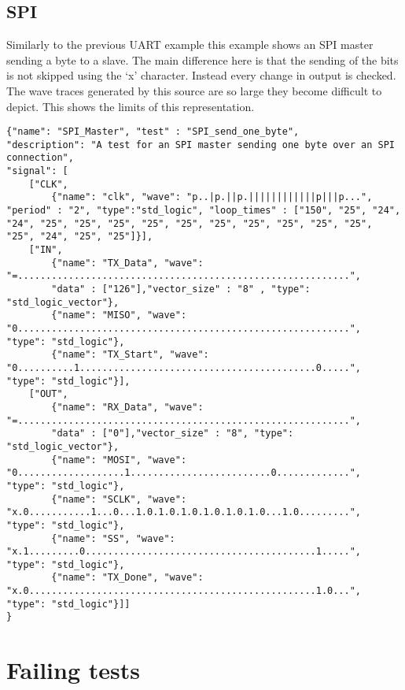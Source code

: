 \subsection{SPI}\label{appendix:more_examples:spi}
Similarly to the previous UART example this example shows an SPI master sending a byte to a slave. The main difference here is that the sending of the bits is not skipped using the ‘x’ character. Instead every change in output is checked. The wave traces generated by this source are so large they become difficult to depict. This shows the limits of this representation.
\begin{lstlisting}[style=json, caption={Functionality test for the SPI design in appendix \ref{appendix:spi}}, label={json:spi}]
{"name": "SPI_Master", "test" : "SPI_send_one_byte",
"description": "A test for an SPI master sending one byte over an SPI connection",
"signal": [
	["CLK",
		{"name": "clk", "wave": "p..|p.||p.||||||||||||p|||p...", "period" : "2", "type":"std_logic", "loop_times" : ["150", "25", "24", "24", "25", "25", "25", "25", "25", "25", "25", "25", "25", "25", "25", "24", "25", "25"]}],
	["IN",
		{"name": "TX_Data", "wave": "=...........................................................",
		"data" : ["126"],"vector_size" : "8" , "type": "std_logic_vector"},
		{"name": "MISO", "wave": "0...........................................................", "type": "std_logic"},
		{"name": "TX_Start", "wave": "0..........1..........................................0.....", "type": "std_logic"}],
	["OUT",
		{"name": "RX_Data", "wave": "=...........................................................",
		"data" : ["0"],"vector_size" : "8", "type": "std_logic_vector"},
		{"name": "MOSI", "wave": "0...................1.........................0.............", "type": "std_logic"},
		{"name": "SCLK", "wave": "x.0...........1...0...1.0.1.0.1.0.1.0.1.0.1.0...1.0.........", "type": "std_logic"},
		{"name": "SS", "wave": "x.1.........0.........................................1.....", "type": "std_logic"},
		{"name": "TX_Done", "wave": "x.0...................................................1.0...", "type": "std_logic"}]]
}
\end{lstlisting}
\clearpage
\section{Failing tests}

